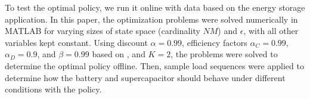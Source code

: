 \documentclass[conference]{IEEEtran}
\begin{document}




To test the optimal policy, we run it online with data based on the energy storage application. In this paper, the optimization problems were solved numerically in MATLAB for varying sizes of state space (cardinality $NM$) and $\epsilon$, with all other variables kept constant. Using discount $\alpha=0.99$, efficiency factors $\alpha_{C}=0.99$, $\alpha_{D}=0.9$, and $\beta=0.99$ based on \cite{su2013modeling}, and $K=2$, the problems were solved to determine the optimal policy offline. Then, sample load sequences were applied to determine how the battery and supercapacitor should behave under different conditions with the policy.
\end{document}
